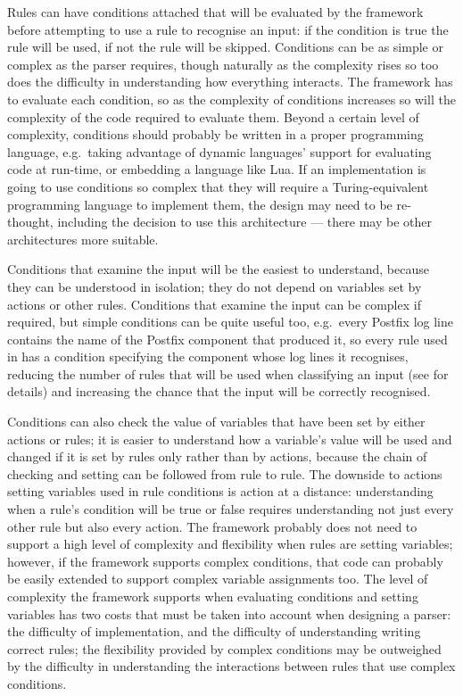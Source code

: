 Rules can have conditions attached that will be evaluated by the framework
before attempting to use a rule to recognise an input: if the condition is
true the rule will be used, if not the rule will be skipped.  Conditions
can be as simple or complex as the parser requires, though naturally as the
complexity rises so too does the difficulty in understanding how everything
interacts.  The framework has to evaluate each condition, so as the
complexity of conditions increases so will the complexity of the code
required to evaluate them.  Beyond a certain level of complexity,
conditions should probably be written in a proper programming language,
e.g.\ taking advantage of dynamic languages' support for evaluating code at
run-time, or embedding a language like Lua.  If an implementation is going
to use conditions so complex that they will require a Turing-equivalent
programming language to implement them, the design may need to be
re-thought, including the decision to use this architecture --- there may
be other architectures more suitable.

Conditions that examine the input will be the easiest to understand,
because they can be understood in isolation; they do not depend on
variables set by actions or other rules.  Conditions that examine the input
can be complex if required, but simple conditions can be quite useful too,
e.g.\ every Postfix log line contains the name of the Postfix component
that produced it, so every rule used in \parsername{} has a condition
specifying the component whose log lines it recognises, reducing the number
of rules that will be used when classifying an input (see  for details) and increasing the chance that the input
will be correctly recognised.

Conditions can also check the value of variables that have been set by
either actions or rules; it is easier to understand how a variable's value
will be used and changed if it is set by rules only rather than by actions,
because the chain of checking and setting can be followed from rule to
rule.  The downside to actions setting variables used in rule conditions is
action at a distance: understanding when a rule's condition will be true or
false requires understanding not just every other rule but also every
action.  The framework probably does not need to support a high level of
complexity and flexibility when rules are setting variables; however, if
the framework supports complex conditions, that code can probably be easily
extended to support complex variable assignments too.  The level of
complexity the framework supports when evaluating conditions and setting
variables has two costs that must be taken into account when designing a
parser: the difficulty of implementation, and the difficulty of
understanding writing correct rules; the flexibility provided by complex
conditions may be outweighed by the difficulty in understanding the
interactions between rules that use complex conditions.

